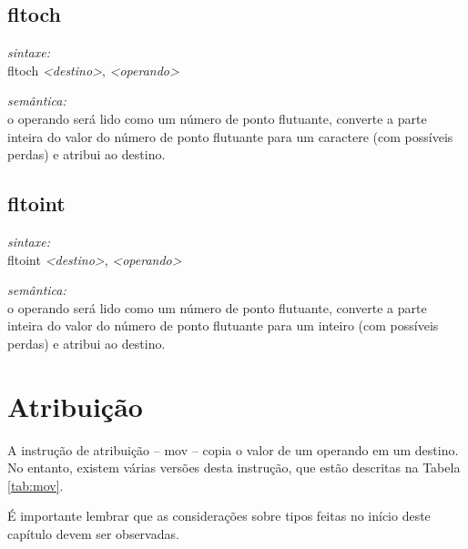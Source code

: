 \documentclass[12pt,a4paper,extrafontsizes,article]{memoir}
\newcommand*{\srcfont}{\fontfamily{pcr}\selectfont}
\begin{document}
\subsection{\textbf{fltoch}}

\textit{sintaxe:}\\{\srcfont fltoch \textit{<destino>}, \textit{<operando>}}

\noindent \textit{semântica:}\\o operando será lido como um número de ponto flutuante, converte a parte inteira do valor do número de ponto
flutuante para um caractere (com possíveis perdas) e atribui ao destino.


\subsection{\textbf{fltoint}}

\textit{sintaxe:}\\{\srcfont fltoint \textit{<destino>}, \textit{<operando>}}

\noindent \textit{semântica:}\\o operando será lido como um número de ponto flutuante, converte a parte inteira do valor do número de ponto
flutuante para um inteiro (com possíveis perdas) e atribui ao destino.


\section{Atribuição}
\label{sec:mov}

A instrução de atribuição -- {\srcfont mov} -- copia o valor de um operando em um destino. No entanto, existem várias
versões desta instrução, que estão descritas na Tabela \ref{tab:mov}.

É importante lembrar que as considerações sobre tipos feitas no início deste capítulo devem ser observadas.
\end{document}
